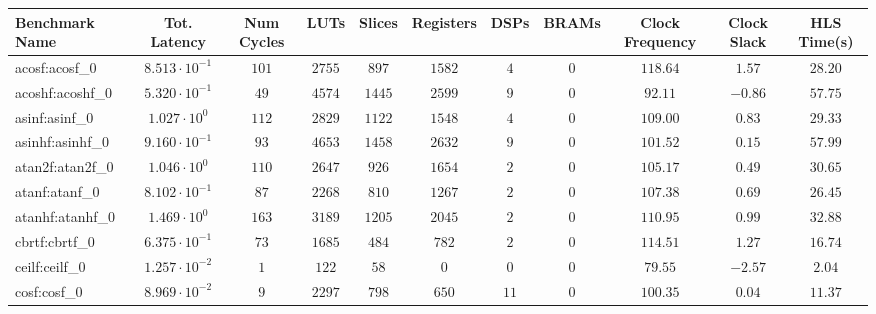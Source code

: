 \begin{tabular}{|l|c|c|c|c|c|c|c|c|c|c|}
\hline
Benchmark Name               & Tot. Latency            & Num Cycles & LUTs      & Slices    & Registers & DSPs    & BRAMs & Clock Frequency & Clock Slack & HLS Time(s) \\
\hline
acosf:acosf\_0               & $ 8.513 \cdot 10^{-1} $ & $ 101    $ & $ 2755  $ & $ 897   $ & $ 1582  $ & $ 4   $ & $ 0 $ & $ 118.64      $ & $ 1.57    $ & $ 28.20   $ \\
acoshf:acoshf\_0             & $ 5.320 \cdot 10^{-1} $ & $ 49     $ & $ 4574  $ & $ 1445  $ & $ 2599  $ & $ 9   $ & $ 0 $ & $ 92.11       $ & $ -0.86   $ & $ 57.75   $ \\
asinf:asinf\_0               & $ 1.027 \cdot 10^{0}  $ & $ 112    $ & $ 2829  $ & $ 1122  $ & $ 1548  $ & $ 4   $ & $ 0 $ & $ 109.00      $ & $ 0.83    $ & $ 29.33   $ \\
asinhf:asinhf\_0             & $ 9.160 \cdot 10^{-1} $ & $ 93     $ & $ 4653  $ & $ 1458  $ & $ 2632  $ & $ 9   $ & $ 0 $ & $ 101.52      $ & $ 0.15    $ & $ 57.99   $ \\
atan2f:atan2f\_0             & $ 1.046 \cdot 10^{0}  $ & $ 110    $ & $ 2647  $ & $ 926   $ & $ 1654  $ & $ 2   $ & $ 0 $ & $ 105.17      $ & $ 0.49    $ & $ 30.65   $ \\
atanf:atanf\_0               & $ 8.102 \cdot 10^{-1} $ & $ 87     $ & $ 2268  $ & $ 810   $ & $ 1267  $ & $ 2   $ & $ 0 $ & $ 107.38      $ & $ 0.69    $ & $ 26.45   $ \\
atanhf:atanhf\_0             & $ 1.469 \cdot 10^{0}  $ & $ 163    $ & $ 3189  $ & $ 1205  $ & $ 2045  $ & $ 2   $ & $ 0 $ & $ 110.95      $ & $ 0.99    $ & $ 32.88   $ \\
cbrtf:cbrtf\_0               & $ 6.375 \cdot 10^{-1} $ & $ 73     $ & $ 1685  $ & $ 484   $ & $ 782   $ & $ 2   $ & $ 0 $ & $ 114.51      $ & $ 1.27    $ & $ 16.74   $ \\
ceilf:ceilf\_0               & $ 1.257 \cdot 10^{-2} $ & $ 1      $ & $ 122   $ & $ 58    $ & $ 0     $ & $ 0   $ & $ 0 $ & $ 79.55       $ & $ -2.57   $ & $ 2.04    $ \\
cosf:cosf\_0                 & $ 8.969 \cdot 10^{-2} $ & $ 9      $ & $ 2297  $ & $ 798   $ & $ 650   $ & $ 11  $ & $ 0 $ & $ 100.35      $ & $ 0.04    $ & $ 11.37   $ \\

\end{tabular}
